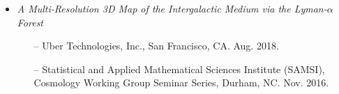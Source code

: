 \documentclass[letterpaper,10pt]{article}
\begin{document}
\begin{itemize}[itemsep=0.3cm, leftmargin=0.6cm]
\item {\it A Multi-Resolution 3D Map of the Intergalactic Medium via the Lyman-$\alpha$ Forest}
\begin{itemize}[leftmargin=0.55cm, itemsep=0.1cm]
\item[--] Uber Technologies, Inc., San Francisco, CA. Aug. 2018.
\item[--] Statistical and Applied Mathematical Sciences Institute (SAMSI), Cosmology Working Group Seminar Series, Durham, NC. Nov. 2016.
\end{itemize}

\end{itemize}


\vspace{0.1cm}
\end{document}
